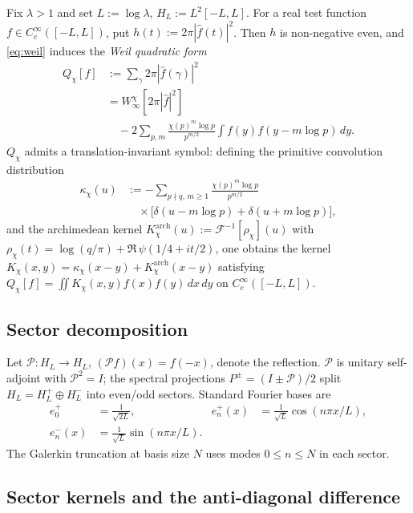 \documentclass[a4paper,10pt,twocolumn]{article}
\theoremstyle{definition}
\theoremstyle{remark}
\newcommand{\chifn}{\chi}
\begin{document}
Fix $\lambda>1$ and set $L:=\log\lambda$, $H_L:=L^2[-L,L]$. For a
real test function $f\in C_c^\infty([-L,L])$, put
$h(t):=2\pi|\hat f(t)|^2$. Then $h$ is non-negative even, and
\eqref{eq:weil} induces the \emph{Weil quadratic form}
\begin{equation}
\label{eq:weil-qf}
\begin{aligned}
  Q_{\chifn}[f]
    &:=\sum_{\gamma}2\pi|\hat f(\gamma)|^2 \\
    &=W^{\chifn}_\infty[2\pi|\hat f|^2] \\
    &\quad -2\sum_{p,m}\frac{\chifn(p)^m\log p}{p^{m/2}}
      \int f(y)f(y-m\log p)\,dy.
\end{aligned}
\end{equation}
$Q_{\chifn}$ admits a translation-invariant symbol: defining the
primitive convolution distribution
\begin{equation}
\label{eq:kappa}
\begin{aligned}
  \kappa_{\chifn}(u)
    &:=-\sum_{p\nmid q,\,m\geq 1}
      \frac{\chifn(p)^m\log p}{p^{m/2}} \\
    &\quad\times
      \bigl[\delta(u-m\log p)+\delta(u+m\log p)\bigr],
\end{aligned}
\end{equation}
and the archimedean kernel
$K^{\mathrm{arch}}_{\chifn}(u):=\mathcal{F}^{-1}[\rho_{\chifn}](u)$
with $\rho_{\chifn}(t)=\log(q/\pi)+\Re\,\psi(1/4+it/2)$, one obtains
the kernel
$K_{\chifn}(x,y)=\kappa_{\chifn}(x-y)+K^{\mathrm{arch}}_{\chifn}(x-y)$
satisfying $Q_{\chifn}[f]=\iint K_{\chifn}(x,y)f(x)f(y)\,dx\,dy$ on
$C_c^\infty([-L,L])$.

\subsection{Sector decomposition}

Let $\mathcal{P}:H_L\to H_L$, $(\mathcal{P}f)(x)=f(-x)$, denote the
reflection. $\mathcal{P}$ is unitary self-adjoint with $\mathcal{P}^2
=I$; the spectral projections $P^\pm=(I\pm\mathcal{P})/2$ split
$H_L=H_L^+\oplus H_L^-$ into even/odd sectors. Standard Fourier bases
are
\[
\begin{aligned}
  e_0^+&=\tfrac{1}{\sqrt{2L}}, &
  e_n^+(x)&=\tfrac{1}{\sqrt L}\cos(n\pi x/L),\\
  e_n^-(x)&=\tfrac{1}{\sqrt L}\sin(n\pi x/L).
\end{aligned}
\]
The Galerkin truncation at basis size $N$ uses modes $0\leq n\leq N$
in each sector.

\subsection{Sector kernels and the anti-diagonal difference}
\end{document}
